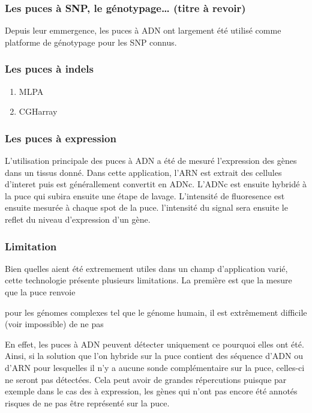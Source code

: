 \documentclass[12pt,twoside]{reedthesis}
\providecommand{\tightlist}{%
  \setlength{\itemsep}{0pt}\setlength{\parskip}{0pt}}
\theoremstyle{definition}
\theoremstyle{definition}
\theoremstyle{remark}
\begin{document}
  \subsubsection{Les puces à SNP, le génotypage\ldots{} (titre à
  revoir)}\label{les-puces-a-snp-le-genotypage-titre-a-revoir}
  
  Depuis leur emmergence, les puces à ADN ont largement été utilisé comme
  platforme de génotypage pour les SNP connus.
  
  \subsubsection{Les puces à indels}\label{les-puces-a-indels}
  
  \begin{enumerate}
  \def\labelenumi{\arabic{enumi}.}
  \tightlist
  \item
    MLPA\\
  \item
    CGHarray
  \end{enumerate}
  
  \subsubsection{Les puces à expression}\label{les-puces-a-expression}
  
  L'utilisation principale des puces à ADN a été de mesuré l'expression
  des gènes dans un tissus donné. Dans cette application, l'ARN est
  extrait des cellules d'interet puis est générallement convertit en ADNc.
  L'ADNc est ensuite hybridé à la puce qui subira ensuite une étape de
  lavage. L'intensité de fluoresence est ensuite mesurée à chaque spot de
  la puce. l'intensité du signal sera ensuite le reflet du niveau
  d'expression d'un gène.
  
  \subsubsection{Limitation}\label{limitation}
  
  Bien quelles aient été extremement utiles dans un champ d'application
  varié, cette technologie présente plusieurs limitations. La première est
  que la mesure que la puce renvoie
  
  pour les génomes complexes tel que le génome humain, il est extrêmement
  difficile (voir impossible) de ne pas
  
  En effet, les puces à ADN peuvent détecter uniquement ce pourquoi elles
  ont été. Ainsi, si la solution que l'on hybride sur la puce contient des
  séquence d'ADN ou d'ARN pour lesquelles il n'y a aucune sonde
  complémentaire sur la puce, celles-ci ne seront pas détectées. Cela peut
  avoir de grandes répercutions puisque par exemple dans le cas des à
  expression, les gènes qui n'ont pas encore été annotés risques de ne pas
  être représenté sur la puce.
  
\end{document}
